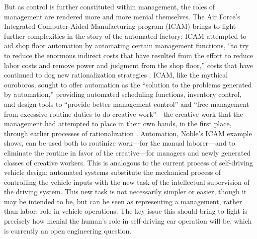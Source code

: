 But as control is further constituted within management, the roles of
management are rendered more and more menial themselves. The Air
Force's Integrated Computer-Aided Manufacturing program (ICAM)
brings to light further complexities in the story of the automated
factory: ICAM attempted to aid shop floor automation by automating certain
management functions, ``to try to reduce the enormous indirect costs
that have resulted from the effort to reduce labor costs and remove
power and judgment from the shop floor,'' costs that have continued to
dog new rationalization strategies \cite[p. 330]{nobleForces}. ICAM, like the mythical
ouroboros, sought to offer automation as the ``solution to the problems
generated by automation,'' providing automated scheduling functions,
inventory control, and design tools to ``provide better management
control'' and ``free management from excessive routine duties to do
creative work''---the creative work that the management had attempted to
place in their own hands, in the first place, through earlier
processes of rationalization \cite[p. 330]{nobleForces}. Automation, Noble's ICAM example shows,
can be used both to routinize work---for the manual laborer---and to
eliminate the routine in favor of the creative---for managers and newly
generated classes of creative workers. This is analogous to the
current process of self-driving vehicle design: automated systems
substitute the mechanical process of controlling the vehicle inputs
with the new task of the intellectual supervision of the driving
system. This new task is not necessarily simpler or easier, though it
may be intended to be, but can be seen as representing a management,
rather than labor, role in vehicle operations. The key issue this
should bring to light is
precisely how menial the human's role in self-driving car operation
will be, which is currently an open engineering question.


